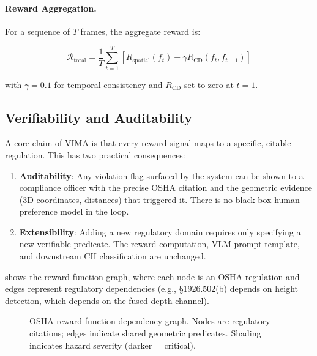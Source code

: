 \documentclass[sigconf,nonacm]{acmart}
\begin{document}
\paragraph{Reward Aggregation.}
For a sequence of $T$ frames, the aggregate reward is:

\begin{equation}
  \mathcal{R}_{\text{total}} =
    \frac{1}{T}\sum_{t=1}^{T}
    \left[R_{\text{spatial}}(f_t) + \gamma R_{\text{CD}}(f_t, f_{t-1})\right]
  \label{eq:total_reward}
\end{equation}

with $\gamma = 0.1$ for temporal consistency and $R_{\text{CD}}$ set to
zero at $t = 1$.

\subsection{Verifiability and Auditability}
\label{sec:verifiability}

A core claim of VIMA is that every reward signal maps to a specific,
citable regulation.
This has two practical consequences:

\begin{enumerate}
  \item \textbf{Auditability}: Any violation flag surfaced by the system
    can be shown to a compliance officer with the precise OSHA citation
    and the geometric evidence (3D coordinates, distances) that triggered it.
    There is no black-box human preference model in the loop.
  \item \textbf{Extensibility}: Adding a new regulatory domain requires
    only specifying a new verifiable predicate.
    The reward computation, VLM prompt template, and downstream CII
    classification are unchanged.
\end{enumerate}

 shows the reward function graph, where each node is
an OSHA regulation and edges represent regulatory dependencies
(e.g., \S1926.502(b) depends on height detection, which depends on the
fused depth channel).

\begin{figure}[t]
  \centering
  \fbox{\rule{0pt}{3.5cm}\rule{0.9\linewidth}{0pt}}
  \caption{OSHA reward function dependency graph.
           Nodes are regulatory citations; edges indicate
           shared geometric predicates. Shading indicates hazard
           severity (darker = critical).}
  \label{fig:reward_graph}
\end{figure}
\end{document}
